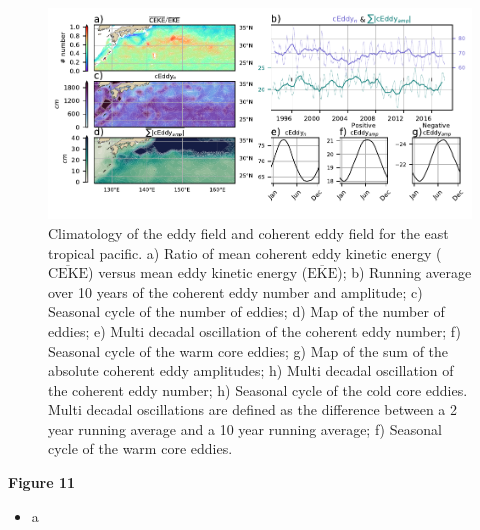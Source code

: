 \documentclass[draft,linenumbers]{agujournal2019}
\newcommand{\MEKE}{\overline{\textrm{EKE}}}
\newcommand{\MCEKE}{\overline{\textrm{CEKE}}}
\begin{document}
	\begin{figure}
	    \centering
	    \includegraphics[width=1\textwidth]{figures/regional_ratios_and_stats_V3_4.pdf}
	    \caption{Climatology of the eddy field and coherent eddy field for the east tropical pacific. a) Ratio of mean coherent eddy kinetic energy ($\MCEKE$) versus mean eddy kinetic energy ($\MEKE$); b) Running average over 10 years of the coherent eddy number and amplitude; c) Seasonal cycle of the number of eddies; d) Map of the number of eddies; 
		e) Multi decadal oscillation of the coherent eddy number; f) Seasonal cycle of the warm core eddies; g) Map of the sum of the absolute coherent eddy amplitudes;  h) Multi decadal oscillation of the coherent eddy number; h) Seasonal cycle of the cold core eddies. Multi decadal oscillations are defined as the difference between a 2 year running average and a 10 year running average; f) Seasonal cycle of the warm core eddies.}
	    \label{fig:south_atlantic_cycle}
	\end{figure}

	\textbf{Figure 11}
	\begin{itemize}
		\item a
	\end{itemize}
\end{document}
